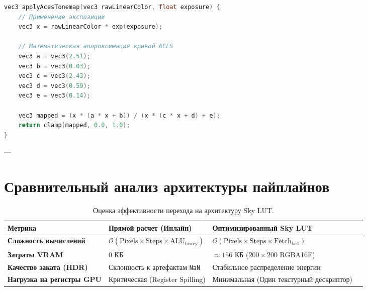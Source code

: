 \documentclass[11pt,a4paper]{article}
\begin{document}
\begin{lstlisting}[language=C, caption={Реализация ACES Tonemapping}]
vec3 applyAcesTonemap(vec3 rawLinearColor, float exposure) {
    // Применение экспозиции
    vec3 x = rawLinearColor * exp(exposure);
    
    // Математическая аппроксимация кривой ACES
    vec3 a = vec3(2.51);
    vec3 b = vec3(0.03);
    vec3 c = vec3(2.43);
    vec3 d = vec3(0.59);
    vec3 e = vec3(0.14);
    
    vec3 mapped = (x * (a * x + b)) / (x * (c * x + d) + e);
    return clamp(mapped, 0.0, 1.0);
}
\end{lstlisting}

---

\section{Сравнительный анализ архитектуры пайплайнов}

\begin{table}[h!]
\centering
\small
\begin{tabular}{llll}
\toprule
\textbf{Метрика} & \textbf{Прямой расчет (Инлайн)} & \textbf{Оптимизированный Sky LUT} \\ \midrule
\textbf{Сложность вычислений} & $\mathcal{O}(\text{Pixels} \times \text{Steps} \times \text{ALU}_{\text{heavy}})$ & $\mathcal{O}(\text{Pixels} \times \text{Steps} \times \text{Fetch}_{\text{fast}})$ \\
\textbf{Затраты VRAM} & 0 КБ & $\approx 156$ КБ ($200 \times 200$ RGBA16F) \\
\textbf{Качество заката (HDR)} & Склонность к артефактам \texttt{NaN} & Стабильное распределение энергии \\
\textbf{Нагрузка на регистры GPU} & Критическая (Register Spilling) & Минимальная (Один текстурный дескриптор) \\ \bottomrule
\end{tabular}
\caption{Оценка эффективности перехода на архитектуру Sky LUT.}
\end{table}
\end{document}
